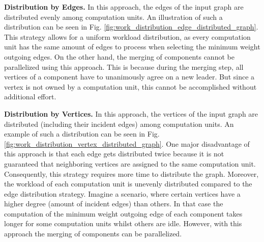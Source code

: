 \documentclass[letterpaper]{article}
\newcommand{\mypar}[1]{{\bf #1.}}
\begin{document}
\mypar{Distribution by Edges}
In this approach, the edges of the input graph are distributed evenly among computation units. An illustration of such a
distribution can be seen in Fig. \ref{fig:work_distribution_edge_distributed_graph}. This strategy allows for a uniform
workload distribution, as every computation unit has the same amount of edges to process when selecting the minimum
weight outgoing edges. On the other hand, the merging of components cannot be parallelized using this approach. This is
because during the merging step, all vertices of a component have to unanimously agree on a new leader. But since a
vertex is not owned by a computation unit, this cannot be accomplished without additional effort.

\mypar{Distribution by Vertices}
In this approach, the vertices of the input graph are distributed (including their incident edges) among computation
units. An example of such a distribution can be seen in Fig. \ref{fig:work_distribution_vertex_distributed_graph}. One
major disadvantage of this approach is that each edge gets distributed twice because it is not guaranteed that
neighboring vertices are assigned to the same computation unit. Consequently, this strategy requires more time to
distribute the graph. Moreover, the workload of each computation unit is unevenly distributed compared to the edge
distribution strategy. Imagine a scenario, where certain vertices have a higher degree (amount of incident edges) than
others. In that case the computation of the minimum weight outgoing edge of each component takes longer for some
computation units whilst others are idle. However, with this approach the merging of components can be parallelized. 
\end{document}
